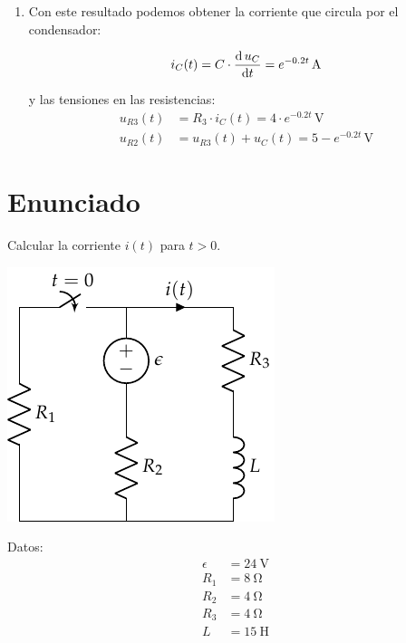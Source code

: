 \begin{enumerate}
\item Con este resultado podemos obtener la corriente que circula por
  el condensador:

\begin{equation*}
  i_C(t) = C \cdot \diff{\,u_C}{t} = e^{-0.2t} \,\unit{\ampere}
\end{equation*}

y las tensiones en las resistencias:
\begin{align*}
  u_{R3}(t) &=  R_3 \cdot i_C(t) = 4 \cdot e^{-0.2t} \,\unit{\volt}\\[3pt]
  u_{R2}(t) &=  u_{R3}(t) + u_C(t) = 5 - e^{-0.2t} \,\unit{\volt}
\end{align*}
    
  
\end{enumerate}

\section{Enunciado}

Calcular la corriente $i(t)$ para $t > 0$.

\begin{minipage}{0.5\textwidth}
  \includegraphics{figuras/FM_4_2}
\end{minipage}
\hfill
\begin{minipage}{0.5\textwidth}
  Datos:
  \begin{align*}
    \epsilon &= \SI{24}{\volt}\\
    R_1 &= \SI{8}{\ohm}\\
    R_2 &= \SI{4}{\ohm}\\
    R_3 &= \SI{4}{\ohm}\\
    L &= \SI{15}{\henry}
  \end{align*}
\end{minipage}

